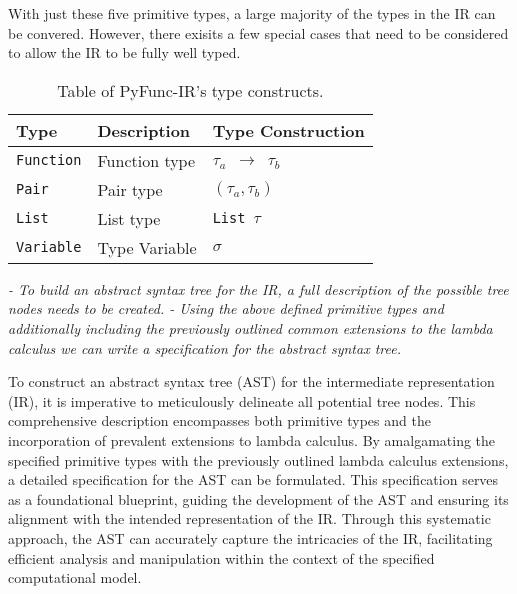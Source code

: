 \documentclass{l4proj}
\begin{document}
With just these five primitive types, a large majority of the types in the IR can be convered.
However, there exisits a few special cases that need to be considered to allow the IR to be fully well typed.

\begin{table}[h]
\caption{Table of PyFunc-IR's type constructs.}
\begin{center}
\begin{tabular}{@{}|l|l|l|@{}}
    \hline
    \textbf{Type}        & \textbf{Description}      & \textbf{Type Construction}  \\
    \hline
    \texttt{Function}    & Function type             & \texttt{$\tau_a$ $\rightarrow$ $\tau_b$} \\
    \texttt{Pair}        & Pair type                 & \texttt{$(\tau_a, \tau_b)$} \\
    \texttt{List}        & List type                 & \texttt{List $\tau$} \\
    \texttt{Variable}    & Type Variable             & \texttt{$\sigma$} \\
    \hline
\end{tabular}
\end{center}
\end{table}

\emph{- To build an abstract syntax tree for the IR, a full description of the possible tree nodes needs to be created.
- Using the above defined primitive types and additionally including the previously outlined common extensions to the lambda calculus we can write a specification for the abstract syntax tree.}

To construct an abstract syntax tree (AST) for the intermediate representation (IR), it is imperative to meticulously delineate all potential tree nodes.
This comprehensive description encompasses both primitive types and the incorporation of prevalent extensions to lambda calculus.
By amalgamating the specified primitive types with the previously outlined lambda calculus extensions, a detailed specification for the AST can be formulated.
This specification serves as a foundational blueprint, guiding the development of the AST and ensuring its alignment with the intended representation of the IR.
Through this systematic approach, the AST can accurately capture the intricacies of the IR, facilitating efficient analysis and manipulation within the context of the specified computational model.
\end{document}
